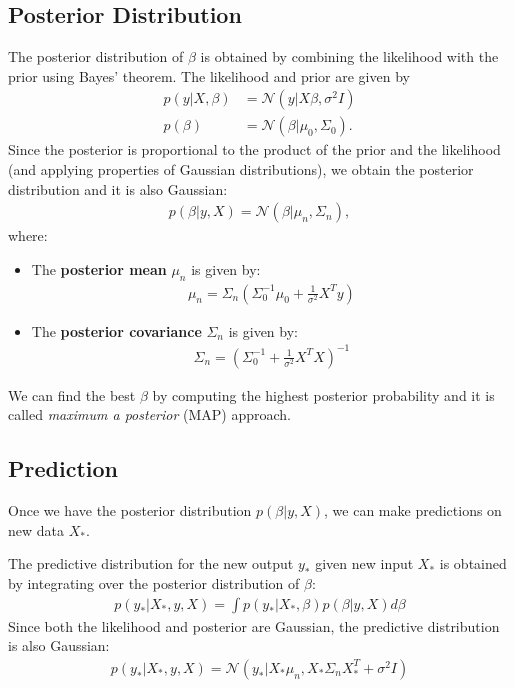 \subsection{Posterior Distribution}
The posterior distribution of $\beta$ is obtained by combining the likelihood with the prior using Bayes' theorem. The likelihood and prior are given by
\begin{align*}
	p(y | X, \beta) &= \mathcal{N}(y | X\beta, \sigma^2 I)\\
	p(\beta) &= \mathcal{N}(\beta | \mu_0, \Sigma_0).
\end{align*}
Since the posterior is proportional to the product of the prior and the likelihood (and applying properties of Gaussian distributions), we obtain the posterior distribution and it is also Gaussian:
\begin{align*}
	p(\beta | y, X) = \mathcal{N}(\beta | \mu_n, \Sigma_n),
\end{align*}
where:
\begin{itemize}
    \item The \textbf{posterior mean} $\mu_n$ is given by:
		\begin{align*}
			\mu_n = \Sigma_n \left( \Sigma_0^{-1} \mu_0 + \frac{1}{\sigma^2} X^T y \right)
		\end{align*}
    \item The \textbf{posterior covariance} $\Sigma_n$ is given by:
		\begin{align*}
			\Sigma_n = \left( \Sigma_0^{-1} + \frac{1}{\sigma^2} X^T X \right)^{-1}
		\end{align*}
\end{itemize}
We can find the best $\beta$ by computing the highest posterior probability and it is called \textit{maximum a posterior} (MAP) approach. 



\subsection{Prediction}
Once we have the posterior distribution $ p(\beta | y, X) $, we can make predictions on new data $ X_*$.

The predictive distribution for the new output $ y_* $ given new input $ X_* $ is obtained by integrating over the posterior distribution of $\beta$:
\begin{align*}
	p(y_* | X_*, y, X) = \int p(y_* | X_*, \beta) p(\beta | y, X) d\beta
\end{align*}
Since both the likelihood and posterior are Gaussian, the predictive distribution is also Gaussian:
\begin{align*}
	p(y_* | X_*, y, X) = \mathcal{N}(y_* | X_*\mu_n, X_*\Sigma_n X_*^T + \sigma^2 I)
\end{align*}

